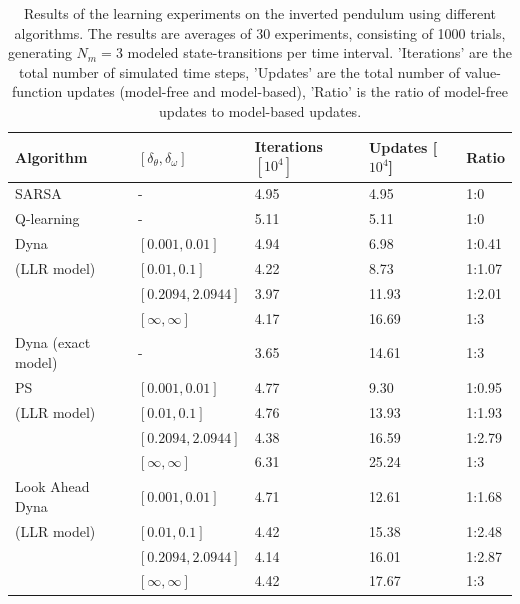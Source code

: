 \begin{table}[htbp]
	\centering
	\caption[Inverted pendulum: Learning results]{Results of the learning experiments on the inverted pendulum using different algorithms. The results are averages of 30 experiments, consisting of 1000 trials, generating $N_m=3$ modeled state-transitions per time interval. 'Iterations' are the total number of simulated time steps, 'Updates' are the total number of value-function updates (model-free and model-based), 'Ratio' is the ratio of model-free updates to model-based updates.}
		\begin{tabular}{l|llll}
			\textbf{Algorithm} & $[\delta_\theta,\delta_\omega]$ & \textbf{Iterations} $[10^4]$  & \textbf{Updates} [$10^4$]& \textbf{Ratio}  \\ 
			\hline\hline
			SARSA 								& -										&   4.95  &   4.95  & 1:0			\\  
			Q-learning 						&	-										&   5.11  &   5.11  & 1:0 		\\   
			\hline 
			Dyna 						  		& $[0.001, 0.01]$ 		&   4.94  &   6.98  & 1:0.41  \\ 
			(\ac{LLR} model)	 		& $[0.01, 0.1]$				&   4.22  &   8.73  & 1:1.07	\\ 
			 											& $[0.2094, 2.0944]$	&   3.97  &  11.93  & 1:2.01  \\ 
			 											& $[\infty,\infty]$		&   4.17  &  16.69  & 1:3     \\	
			\hline
			Dyna (exact model)		& -										&   3.65  &  14.61  & 1:3     \\
			\hline			 
			\acl{PS} 							& $[0.001, 0.01]$			&   4.77  &   9.30  & 1:0.95  \\ 
			(\ac{LLR} model) 			& $[0.01, 0.1]$				&   4.76  &  13.93  & 1:1.93  \\
			 											& $[0.2094, 2.0944]$	&   4.38  &  16.59  & 1:2.79  \\ 
			 											& $[\infty, \infty]$	&   6.31  &  25.24  & 1:3     
			\\ \hline
			Look Ahead Dyna				& $[0.001, 0.01]$			&   4.71  &  12.61  & 1:1.68	\\
			(\ac{LLR} model)			& $[0.01, 0.1]$				&   4.42  &  15.38  & 1:2.48	\\
														& $[0.2094, 2.0944]$	&   4.14  &  16.01  & 1:2.87 	\\
														& $[\infty, \infty]$	&   4.42  &  17.67  & 1:3      			 												
		\end{tabular}
	\label{tab:PS-dyna updates}
\end{table}

